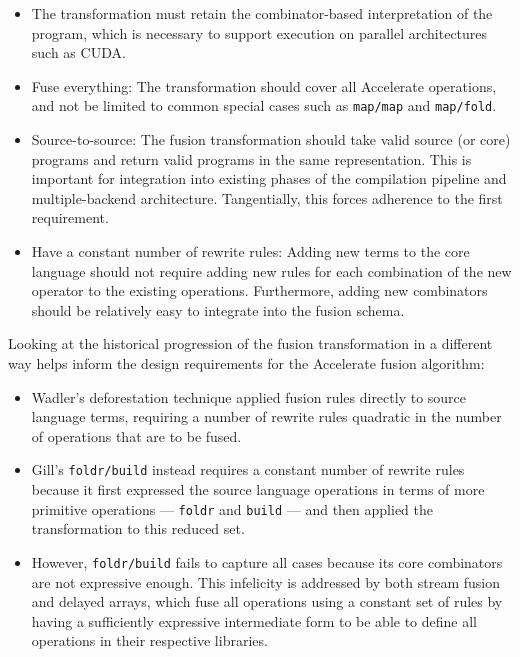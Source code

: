 \begin{itemize}
    \item The transformation must retain the combinator-based interpretation of
        the program, which is necessary to support execution on parallel
        architectures such as CUDA.

    \item Fuse everything: The transformation should cover all Accelerate
        operations, and not be limited to common special cases such as
        \texttt{map/map} and \texttt{map/fold}.

    \item Source-to-source: The fusion transformation should take valid source
        (or core) programs and return valid programs in the same representation.
        This is important for integration into existing phases of the compilation
        pipeline and multiple-backend architecture. Tangentially, this forces
        adherence to the first requirement.

    \item Have a constant number of rewrite rules: Adding new terms to the core
        language should not require adding new rules for each combination of the
        new operator to the existing operations. Furthermore, adding new
        combinators should be relatively easy to integrate into the fusion
        schema.
\end{itemize}
%
Looking at the historical progression of the fusion transformation in a
different way helps inform the design requirements for the Accelerate fusion
algorithm:
%
\begin{itemize}
    \item Wadler's deforestation technique applied fusion rules directly to
        source language terms, requiring a number of rewrite rules quadratic in
        the number of operations that are to be fused.

    \item Gill's \texttt{foldr/build} instead requires a constant number of
        rewrite rules because it first expressed the source language operations
        in terms of more primitive operations --- \texttt{foldr} and
        \texttt{build} --- and then applied the transformation to this reduced
        set.

    \item However, \texttt{foldr/build} fails to capture all cases because its
        core combinators are not expressive enough. This infelicity is addressed
        by both stream fusion and delayed arrays, which fuse all operations
        using a constant set of rules by having a sufficiently expressive
        intermediate form to be able to define all operations in their
        respective libraries.
\end{itemize}

